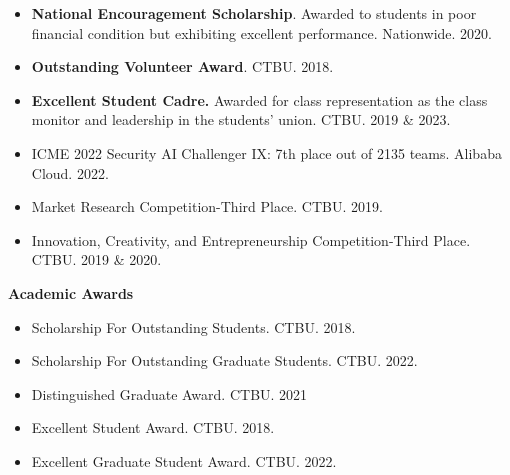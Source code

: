 \documentclass[a4paper,20pt]{article}
\begin{document}
    \begin{itemize}
    \centering
    \justifying
 \item {\textbf{National Encouragement Scholarship}. Awarded to students in poor financial condition but exhibiting excellent performance. Nationwide. 2020.}
\vspace{-5pt}	
    \item {\textbf{Outstanding Volunteer Award}. CTBU. 2018.}
    \vspace{-5pt}
    \item {\textbf{Excellent Student Cadre.} Awarded for class representation as the class monitor and leadership in the students' union. CTBU. 2019 \& 2023.}
    \vspace{-5pt}
    \item {ICME 2022 Security AI Challenger IX: 7th place out of 2135 teams. Alibaba Cloud. 2022.}
    \vspace{-5pt}
    \item {Market Research Competition-Third Place. CTBU. 2019.}
    \vspace{-5pt}
    \item {Innovation, Creativity, and Entrepreneurship Competition-Third Place. CTBU. 2019 \& 2020.}
\end{itemize}


 \textbf{Academic Awards}

    \begin{itemize}
    \centering
    \justifying
   \item{Scholarship For Outstanding Students. CTBU. 2018.}
    \vspace{-5pt}
       \item{Scholarship For Outstanding Graduate Students. CTBU. 2022.}
    \vspace{-5pt}
    \item{Distinguished Graduate Award. CTBU. 2021}
        \vspace{-5pt}
        \item{Excellent Student Award. CTBU. 2018.}
    \vspace{-5pt}
    \item{Excellent Graduate Student Award. CTBU. 2022.}

    
\end{itemize}
\end{document}

